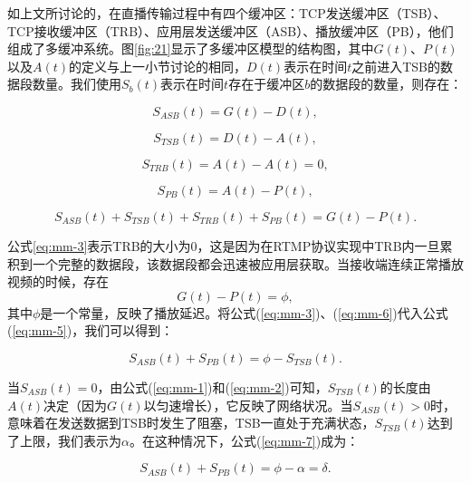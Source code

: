 如上文所讨论的，在直播传输过程中有四个缓冲区：TCP发送缓冲区（TSB）、TCP接收缓冲区（TRB）、应用层发送缓冲区（ASB）、播放缓冲区（PB），他们组成了多缓冲系统。图\ref{fig:21}显示了多缓冲区模型的结构图，其中$G(t)$、$P(t)$以及$A(t)$的定义与上一小节讨论的相同，$D(t)$表示在时间$t$之前进入TSB的数据段数量。我们使用$S_b(t)$表示在时间$t$存在于缓冲区$b$的数据段的数量，则存在：

\begin{equation}
\label{eq:mm-1}
S_{ASB}(t)=G(t)-D(t),
\end{equation}

\begin{equation}
\label{eq:mm-2}
S_{TSB}(t)=D(t)-A(t),
\end{equation}

\begin{equation}
\label{eq:mm-3}
S_{TRB}(t)=A(t)-A(t)=0,
\end{equation}

\begin{equation}
\label{eq:mm-4}
S_{PB}(t) =A(t)-P(t),
\end{equation}

\begin{equation}
\label{eq:mm-5}
S_{ASB}(t)+S_{TSB}(t)+S_{TRB}(t)+S_{PB}(t)=G(t)-P(t).
\end{equation}

公式\ref{eq:mm-3}表示TRB的大小为0，这是因为在RTMP协议实现中TRB内一旦累积到一个完整的数据段，该数据段都会迅速被应用层获取。当接收端连续正常播放视频的时候，存在
\begin{equation}
\label{eq:mm-6}
G(t)-P(t)=\phi,
\end{equation}
其中$\phi$是一个常量，反映了播放延迟。将公式(\ref{eq:mm-3})、(\ref{eq:mm-6})代入公式(\ref{eq:mm-5})，我们可以得到：

\begin{equation}
\label{eq:mm-7}
S_{ASB}(t)+S_{PB}(t)=\phi-S_{TSB}(t).
\end{equation}

当$S_{ASB}(t)=0$，由公式(\ref{eq:mm-1})和(\ref{eq:mm-2})可知，$S_{TSB}(t)$的长度由$A(t)$决定（因为$G(t)$以匀速增长），它反映了网络状况。当$S_{ASB}(t)>0$时，意味着在发送数据到TSB时发生了阻塞，TSB一直处于充满状态，$S_{TSB}(t)$达到了上限，我们表示为$\alpha$。在这种情况下，公式(\ref{eq:mm-7})成为：

\begin{equation}
\label{eq:mm-8}
S_{ASB}(t)+S_{PB}(t)=\phi-\alpha=\delta.
\end{equation}

